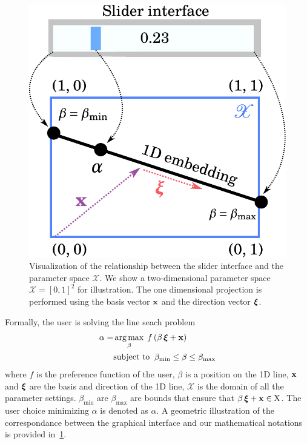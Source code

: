 \begin{figure}[h]
  \centering
  \includegraphics[scale=0.35]{figures/linesearch.pdf}
  \caption{Visualization of the relationship between the slider interface and the parameter space \(\mathcal{X}\).
    We show a two-dimensional parameter space \(\mathcal{X} = {[0, 1]}^2\) for illustration.
    The one dimensional projection is performed using the basis vector \(\mathbf{x}\) and the direction vector \(\bm{\xi}\).
  }\label{fig:linesearch}
\end{figure}
%
Formally, the user is solving the line seach problem
\begin{align}
 \alpha = &\operatorname*{arg\,max}_{ \beta }\; f\,(\beta\,\bm{\xi} + \mathbf{x}) \\
 &\text{subject to}\;\; \beta_{\mathrm{min}} \leq \beta \leq \beta_{\mathrm{max}}
\end{align}
where \(f\) is the preference function of the user, \(\beta\) is a position on the 1D line, \(\mathbf{x}\) and \(\bm{\xi}\) are the basis and direction of the 1D line, \(\mathcal{X}\) is the domain of all the parameter settings.
\(\beta_{\mathrm{min}}\) are \(\beta_{\mathrm{max}}\) are bounds that ensure that \(\beta\,\bm{\xi} + \mathbf{x}  \in \mathrm{X}\).
The user choice minimizing \(\alpha\) is denoted as \(\alpha\).
A geometric illustration of the correspondance between the graphical interface and our mathematical notations is provided in~\cref{fig:linesearch}.

